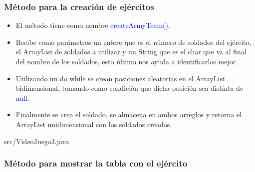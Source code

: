 \documentclass{article}
\begin{document}
        \subsubsection{Método para la creación de ejércitos}

        \begin{itemize}
            \item El método tiene como nombre \textcolor{blue}{createArmyTeam()}.
            \item Recibe como parámetros un entero que es el número de soldados del ejército, el ArrayList de soldados a utilizar y un String que es el char que va al final del nombre de los soldados, esto último nos ayuda a identificarlos mejor.
            \item Utilizando un do while se crean posiciones aleatorias en el ArrayList bidimensional, tomando como condición que dicha posición sea distinta de \textcolor{blue}{null}.
            \item Finalmente se crea el soldado, se almacena en ambos arreglos y retorna el ArrayList unidimensional con los soldados creados.

        \end{itemize}
        
        
        {src/VideoJuego3.java}

        
        \subsubsection{Método para mostrar la tabla con el ejército}
\end{document}
